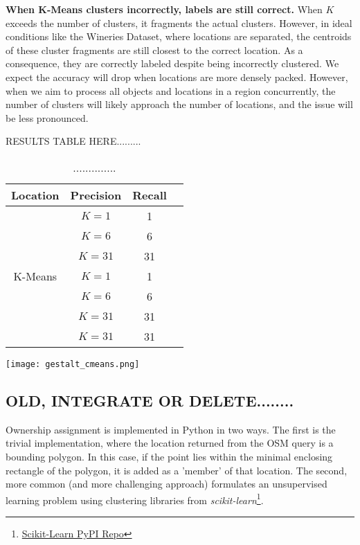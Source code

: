 \textbf{When K-Means clusters incorrectly, labels are still correct.} When $K$ exceeds the number of clusters, it fragments the actual clusters. 
However, in ideal conditions like the Wineries Dataset, where locations are separated, the centroids of these cluster fragments are still closest to the correct location. 
As a consequence, they are correctly labeled despite being incorrectly clustered. We expect the accuracy will drop when locations are more densely packed. However, when we aim to process all objects and locations in a region concurrently, the number of clusters will likely approach the number of locations, and the issue will be less pronounced. 


RESULTS TABLE HERE.........
\begin{table}[h!]
	\begin{center}
		\begin{tabular}{ |c|c|c|c| } 
			\hline
			Location & Precision & Recall \\
			\hline
			\multirow{7}{4em}{K-Means} 
                & $K=1$ & 1 \\ 
			& $K=6$ & 6  \\ 
			& $K=31$ & 31 \\ 
                & $K=1$ & 1 \\ 
			& $K=6$ & 6  \\ 
			& $K=31$ & 31 \\ 
   			& $K=31$ & 31 \\ 
			\hline
		\end{tabular}
		\label{table:clustering}
		\caption{..............}
	\end{center}
\end{table}


\begin{figure*}[ht]
\label{fig:cmeans}        
\texttt{[image: gestalt\_cmeans.png]}
\centering
\caption[width=\textwidth]{............}
\end{figure*}



\subsection{OLD, INTEGRATE OR DELETE........}
Ownership assignment is implemented in Python in two ways. The first is the trivial implementation, where the location returned from the OSM query is a bounding polygon. 
In this case, if the point lies within the minimal enclosing rectangle of the polygon, it is added as a 'member' of that location. 
The second, more common (and more challenging approach) formulates an unsupervised learning problem using clustering libraries from \textit{scikit-learn}\footnote{\href{https://pypi.org/project/scikit-learn/}{Scikit-Learn PyPI Repo}}. 

